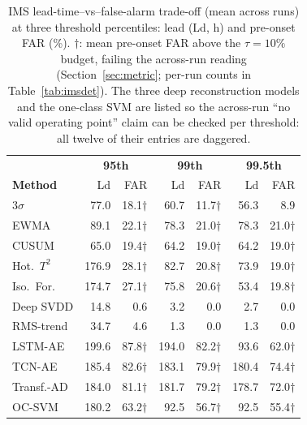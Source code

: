 \begin{table}[t] \small
	\setlength{\tabcolsep}{4pt}
	\begin{center}
	\caption{IMS lead-time--vs--false-alarm trade-off (mean across runs) at three threshold percentiles: lead (Ld, h) and pre-onset FAR (\%). $\dagger$: mean pre-onset FAR above the $\tau=10\%$ budget, failing the across-run reading (Section~\ref{sec:metric}; per-run counts in Table~\ref{tab:imsdet}). The three deep reconstruction models and the one-class SVM are listed so the across-run ``no valid operating point'' claim can be checked per threshold: all twelve of their entries are daggered.}
	\label{tab:tradeoff}
	\begin{tabular}{l r r r r r r}
		\hline \hline
		 & \multicolumn{2}{c}{\textbf{95th}} & \multicolumn{2}{c}{\textbf{99th}} & \multicolumn{2}{c}{\textbf{99.5th}} \\
		\textbf{Method} & Ld & FAR & Ld & FAR & Ld & FAR \\
		\hline
		$3\sigma$ & 77.0 & 18.1$\dagger$ & 60.7 & 11.7$\dagger$ & 56.3 & 8.9 \\
		EWMA & 89.1 & 22.1$\dagger$ & 78.3 & 21.0$\dagger$ & 78.3 & 21.0$\dagger$ \\
		CUSUM & 65.0 & 19.4$\dagger$ & 64.2 & 19.0$\dagger$ & 64.2 & 19.0$\dagger$ \\
		Hot.\ $T^2$ & 176.9 & 28.1$\dagger$ & 82.7 & 20.8$\dagger$ & 73.9 & 19.0$\dagger$ \\
		Iso.\ For. & 174.7 & 27.1$\dagger$ & 75.8 & 20.6$\dagger$ & 53.4 & 19.8$\dagger$ \\
		Deep SVDD & 14.8 & 0.6 & 3.2 & 0.0 & 2.7 & 0.0 \\
		RMS-trend & 34.7 & 4.6 & 1.3 & 0.0 & 1.3 & 0.0 \\
		LSTM-AE & 199.6 & 87.8$\dagger$ & 194.0 & 82.2$\dagger$ & 93.6 & 62.0$\dagger$ \\
		TCN-AE & 185.4 & 82.6$\dagger$ & 183.1 & 79.9$\dagger$ & 180.4 & 74.4$\dagger$ \\
		Transf.-AD & 184.0 & 81.1$\dagger$ & 181.7 & 79.2$\dagger$ & 178.7 & 72.0$\dagger$ \\
		OC-SVM & 180.2 & 63.2$\dagger$ & 92.5 & 56.7$\dagger$ & 92.5 & 55.4$\dagger$ \\
		\hline \hline
	\end{tabular}
	\end{center}
\end{table}
